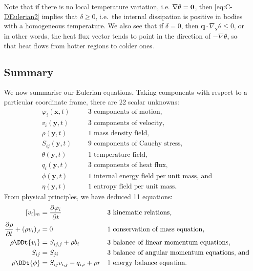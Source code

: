 \documentclass[
  letterpaper,
  DIV=11,
  numbers=noendperiod]{scrreprt}
\theoremstyle{plain}
\theoremstyle{remark}
\begin{document}
Note that if there is no local temperature variation, i.e.
\(\nabla\theta=\bf0\), then
\hyperref[eq:C-DEulerian2]{{[}eq:C-DEulerian2{]}} implies that
\(\delta\geq0\), i.e.~the internal dissipation is positive in bodies
with a homogeneous temperature. We also see that if \(\delta=0\), then
\({\boldsymbol{q}}\cdot\nabla_{\boldsymbol{y}}\theta\leq0\), or in other
words, the heat flux vector tends to point in the direction of
\(-\nabla\theta\), so that heat flows from hotter regions to colder
ones.

\subsection{Summary}\label{summary}

We now summarise our Eulerian equations. Taking components with respect
to a particular coordinate frame, there are 22 scalar unknowns:
\[\begin{aligned}
    \varphi_i({\boldsymbol{x}},t) &&&\text{3 components of motion,}\\
    v_i({\boldsymbol{y}},t) &&&\text{3 components of velocity,}\\
    \rho({\boldsymbol{y}},t) &&&\text{1 mass density field,}\\
    S_{ij}({\boldsymbol{y}},t) &&&\text{9 components of Cauchy stress,}\\
    \theta({\boldsymbol{y}},t) &&&\text{1 temperature field,}\\
    q_i({\boldsymbol{y}},t) &&&\text{3 components of heat flux,}\\
    \phi({\boldsymbol{y}},t) &&&\text{1 internal energy field per unit mass, and}\\
    \eta({\boldsymbol{y}},t) &&&\text{1 entropy field per unit mass.}
  \end{aligned}\] From physical principles, we have deduced 11
equations: \[\begin{aligned}[]
    [v_i]_m &= \frac{\partial\varphi_i}{\partial t}&& \text{3 kinematic relations,}\\
    \frac{\partial\rho}{\partial t} +(\rho v_i)_{,i}&=0&& \text{1 conservation of mass equation,}\\
    \rho \DDt{v_i} &= S_{ij,j}+\rho b_i&& \text{3 balance of linear momentum equations,}\\
    S_{ij} &= S_{ji} && \text{3 balance of angular momentum equations, and}\\
    \rho\DDt{\phi} &= S_{ij}v_{i,j}-q_{i,i}+\rho r &&\text{1 energy balance equation.}
  \end{aligned}\]
\end{document}
